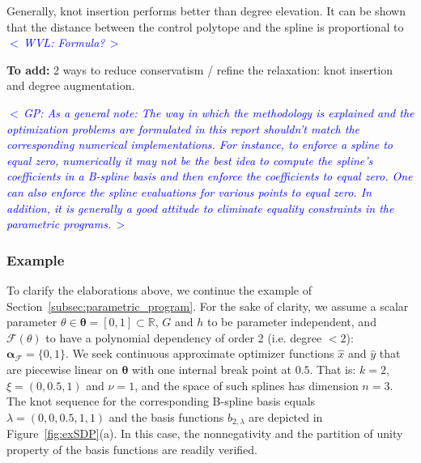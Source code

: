\documentclass{article}
\newcommand{\commentGP}[1]{\noindent \textcolor{blue}{\emph{$<\,$GP: #1$\,>$}}}%
\newcommand{\commentWVL}[1]{\noindent \textcolor{blue}{\emph{$<\,$WVL: #1$\,>$}}}%
\newcommand{\R}{\mathbb{R}}         %
\newcommand{\ppar}{\theta}                          %
\newcommand{\Ppar}{{\bm{\theta}}}                   %
\newcommand{\calF}{\mathcal{F}}                     %
\newcommand{\Alpha}{\bm{\alpha}}    %
\begin{document}
Generally, knot insertion performs better than degree elevation. It can be
shown that the distance between the control polytope and the spline is
proportional to~\cite{deBoor_2001} \commentWVL{Formula?}

\noindent \textbf{To add:} 2 ways to reduce conservatism / refine the relaxation: knot insertion and degree augmentation.

\commentGP{As a general note: The way in which the methodology is explained and the optimization problems are formulated in this report shouldn't match the corresponding numerical implementations. For instance, to enforce a spline to equal zero, numerically it may not be the best idea to compute the spline's coefficients in a B-spline basis and then enforce the coefficients to equal zero. One can also enforce the spline evaluations for various points to equal zero. In addition, it is generally a good attitude to eliminate equality constraints in the parametric programs.}


\subsubsection{Example}

To clarify the elaborations above, we continue the example of Section~\ref{subsec:parametric_program}. For the sake of clarity, we assume a scalar parameter $\ppar\in\Ppar=[0,1]\subset\R$, $G$ and $h$ to be parameter independent, and $\calF(\ppar)$ to have a polynomial dependency of order 2 (i.e. degree $<2$): $\Alpha_\calF = \{0,1\}$. We seek continuous approximate optimizer functions $\hat{x}$ and $\hat{y}$ that are piecewise linear on $\Ppar$ with one internal break point at $0.5$. That is: $k=2$, $\xi = (0, 0.5, 1)$ and $\nu = 1$, and the space of such splines has dimension $n=3$. The knot sequence for the corresponding  B-spline basis equals $\lambda=(0,0,0.5,1,1)$ and the basis functions  $b_{2,\lambda}$ are depicted in Figure~\ref{fig:exSDP}(a). In this case, the nonnegativity and the partition of unity property of the basis functions are readily verified.
\end{document}
